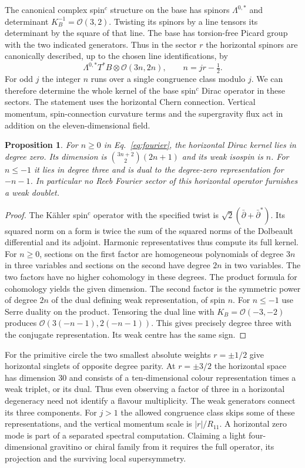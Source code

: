 \documentclass[aps,prd,reprint,onecolumn,nofootinbib,amsmath,amssymb]{revtex4-2}
\newtheorem{proposition}{Proposition}
\begin{document}
The canonical complex spin$^c$ structure on the base has spinors $\Lambda^{0,*}$ and determinant $K_B^{-1}=\mathcal O(3,2)$. Twisting its spinors by a line tensors its determinant by the square of that line. The base has torsion-free Picard group with the two indicated generators. Thus in the sector $r$ the horizontal spinors are canonically described, up to the chosen line identifications, by
\begin{equation}
 \Lambda^{0,*}T^*B\otimes\mathcal O(3n,2n),
 \qquad n=jr-\tfrac12 .
 \label{eq:fourier}
\end{equation}
For odd $j$ the integer $n$ runs over a single congruence class modulo $j$. We can therefore determine the whole kernel of the base spin$^c$ Dirac operator in these sectors. The statement uses the horizontal Chern connection. Vertical momentum, spin-connection curvature terms and the supergravity flux act in addition on the eleven-dimensional field.

\begin{proposition}
For $n\geq0$ in Eq.~\eqref{eq:fourier}, the horizontal Dirac kernel lies in degree zero. Its dimension is $\binom{3n+2}{2}(2n+1)$ and its weak isospin is $n$. For $n\leq-1$ it lies in degree three and is dual to the degree-zero representation for $-n-1$. In particular no Reeb Fourier sector of this horizontal operator furnishes a weak doublet.
\end{proposition}

\begin{proof}
The Kähler spin$^c$ operator with the specified twist is $\sqrt2(\bar\partial+\bar\partial^*)$. Its squared norm on a form is twice the sum of the squared norms of the Dolbeault differential and its adjoint. Harmonic representatives thus compute its full kernel. For $n\geq0$, sections on the first factor are homogeneous polynomials of degree $3n$ in three variables and sections on the second have degree $2n$ in two variables. The two factors have no higher cohomology in these degrees. The product formula for cohomology yields the given dimension. The second factor is the symmetric power of degree $2n$ of the dual defining weak representation, of spin $n$. For $n\leq-1$ use Serre duality on the product. Tensoring the dual line with $K_B=\mathcal O(-3,-2)$ produces $\mathcal O(3(-n-1),2(-n-1))$. This gives precisely degree three with the conjugate representation. Its weak centre has the same sign.
\end{proof}

For the primitive circle the two smallest absolute weights $r=\pm1/2$ give horizontal singlets of opposite degree parity. At $r=\pm3/2$ the horizontal space has dimension 30 and consists of a ten-dimensional colour representation times a weak triplet, or its dual. Thus even observing a factor of three in a horizontal degeneracy need not identify a flavour multiplicity. The weak generators connect its three components. For $j>1$ the allowed congruence class skips some of these representations, and the vertical momentum scale is $|r|/R_{11}$. A horizontal zero mode is part of a separated spectral computation. Claiming a light four-dimensional gravitino or chiral family from it requires the full operator, its projection and the surviving local supersymmetry.
\end{document}

